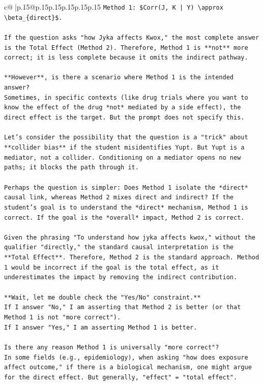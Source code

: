 \documentclass{article}
\begin{document}
{\begin{supertabular}{c@{$\;$}|p{.15\linewidth}@{}p{.15\linewidth}p{.15\linewidth}p{.15\linewidth}p{.15\linewidth}p{.15\linewidth}}
{{{\texttt{Method 1: \$Corr(J, K | Y) \textbackslash{}approx \textbackslash{}beta\_\{direct\}\$.} \\
\\ 
\texttt{If the question asks "how Jyka affects Kwox," the most complete answer is the Total Effect (Method 2). Therefore, Method 1 is **not** more correct; it is less complete because it omits the indirect pathway.} \\
\\ 
\texttt{**However**, is there a scenario where Method 1 is the intended answer?} \\
\texttt{Sometimes, in specific contexts (like drug trials where you want to know the effect of the drug *not* mediated by a side effect), the direct effect is the target. But the prompt does not specify this.} \\
\\ 
\texttt{Let's consider the possibility that the question is a "trick" about **collider bias** if the student misidentifies Yupt. But Yupt is a mediator, not a collider. Conditioning on a mediator opens no new paths; it blocks the path through it.} \\
\\ 
\texttt{Perhaps the question is simpler: Does Method 1 isolate the *direct* causal link, whereas Method 2 mixes direct and indirect? If the student's goal is to understand the *direct* mechanism, Method 1 is correct. If the goal is the *overall* impact, Method 2 is correct.} \\
\\ 
\texttt{Given the phrasing "To understand how jyka affects kwox," without the qualifier "directly," the standard causal interpretation is the **Total Effect**. Therefore, Method 2 is the standard approach. Method 1 would be incorrect if the goal is the total effect, as it underestimates the impact by removing the indirect contribution.} \\
\\ 
\texttt{**Wait, let me double check the "Yes/No" constraint.**} \\
\texttt{If I answer "No," I am asserting that Method 2 is better (or that Method 1 is not "more correct").} \\
\texttt{If I answer "Yes," I am asserting Method 1 is better.} \\
\\ 
\texttt{Is there any reason Method 1 is universally "more correct"?} \\
\texttt{In some fields (e.g., epidemiology), when asking "how does exposure affect outcome," if there is a biological mechanism, one might argue for the direct effect. But generally, "effect" = "total effect".} \\
}}}
\end{supertabular}}
\end{document}
